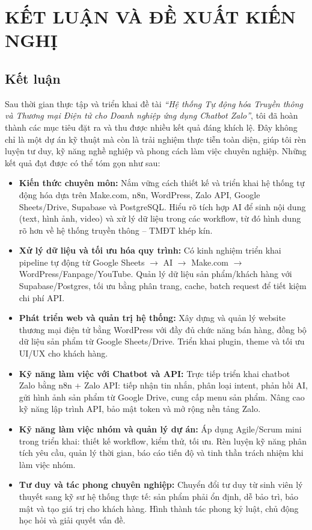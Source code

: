 \chapter{KẾT LUẬN VÀ ĐỀ XUẤT KIẾN NGHỊ}
\section{Kết luận}
Sau thời gian thực tập và triển khai đề tài 
\textit{``Hệ thống Tự động hóa Truyền thông và Thương mại Điện tử cho Doanh nghiệp ứng dụng Chatbot Zalo''}, 
tôi đã hoàn thành các mục tiêu đặt ra và thu được nhiều kết quả đáng khích lệ. 
Đây không chỉ là một dự án kỹ thuật mà còn là trải nghiệm thực tiễn toàn diện, 
giúp tôi rèn luyện tư duy, kỹ năng nghề nghiệp và phong cách làm việc chuyên nghiệp. 
Những kết quả đạt được có thể tóm gọn như sau:

\begin{itemize}
    \item \textbf{Kiến thức chuyên môn:} 
    Nắm vững cách thiết kế và triển khai hệ thống tự động hóa dựa trên Make.com, n8n, WordPress, 
    Zalo API, Google Sheets/Drive, Supabase và PostgreSQL. 
    Hiểu rõ tích hợp AI để sinh nội dung (text, hình ảnh, video) và xử lý dữ liệu trong các workflow, 
    từ đó hình dung rõ hơn về hệ thống truyền thông -- TMĐT khép kín.
    
    \item \textbf{Xử lý dữ liệu và tối ưu hóa quy trình:} 
    Có kinh nghiệm triển khai pipeline tự động từ Google Sheets $\rightarrow$ AI $\rightarrow$ Make.com $\rightarrow$ WordPress/Fanpage/YouTube. 
    Quản lý dữ liệu sản phẩm/khách hàng với Supabase/Postgres, tối ưu bằng phân trang, cache, batch request để tiết kiệm chi phí API.
    
    \item \textbf{Phát triển web và quản trị hệ thống:} 
    Xây dựng và quản lý website thương mại điện tử bằng WordPress với đầy đủ chức năng bán hàng, 
    đồng bộ dữ liệu sản phẩm từ Google Sheets/Drive. 
    Triển khai plugin, theme và tối ưu UI/UX cho khách hàng.
    
    \item \textbf{Kỹ năng làm việc với Chatbot và API:} 
    Trực tiếp triển khai chatbot Zalo bằng n8n + Zalo API: tiếp nhận tin nhắn, phân loại intent, 
    phản hồi AI, gửi hình ảnh sản phẩm từ Google Drive, cung cấp menu sản phẩm. 
    Nâng cao kỹ năng lập trình API, bảo mật token và mở rộng nền tảng Zalo.
    
    \item \textbf{Kỹ năng làm việc nhóm và quản lý dự án:} 
    Áp dụng Agile/Scrum mini trong triển khai: thiết kế workflow, kiểm thử, tối ưu. 
    Rèn luyện kỹ năng phân tích yêu cầu, quản lý thời gian, báo cáo tiến độ và tinh thần trách nhiệm khi làm việc nhóm.
    
    \item \textbf{Tư duy và tác phong chuyên nghiệp:} 
    Chuyển đổi tư duy từ sinh viên lý thuyết sang kỹ sư hệ thống thực tế: 
    sản phẩm phải ổn định, dễ bảo trì, bảo mật và tạo giá trị cho khách hàng. 
    Hình thành tác phong kỷ luật, chủ động học hỏi và giải quyết vấn đề.
\end{itemize}

